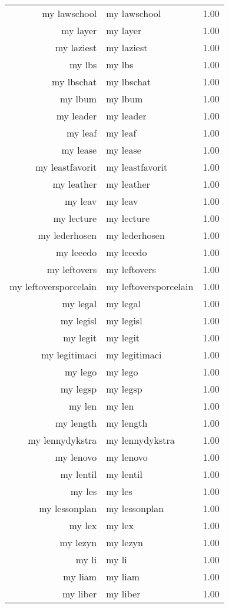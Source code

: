 \begin{table}[ht]
\begin{tabular}{rlr}
  my lawschool & my lawschool & 1.00 \\ 
  my layer & my layer & 1.00 \\ 
  my laziest & my laziest & 1.00 \\ 
  my lbs & my lbs & 1.00 \\ 
  my lbschat & my lbschat & 1.00 \\ 
  my lbum & my lbum & 1.00 \\ 
  my leader & my leader & 1.00 \\ 
  my leaf & my leaf & 1.00 \\ 
  my lease & my lease & 1.00 \\ 
  my leastfavorit & my leastfavorit & 1.00 \\ 
  my leather & my leather & 1.00 \\ 
  my leav & my leav & 1.00 \\ 
  my lecture & my lecture & 1.00 \\ 
  my lederhosen & my lederhosen & 1.00 \\ 
  my leeedo & my leeedo & 1.00 \\ 
  my leftovers & my leftovers & 1.00 \\ 
  my leftoversporcelain & my leftoversporcelain & 1.00 \\ 
  my legal & my legal & 1.00 \\ 
  my legisl & my legisl & 1.00 \\ 
  my legit & my legit & 1.00 \\ 
  my legitimaci & my legitimaci & 1.00 \\ 
  my lego & my lego & 1.00 \\ 
  my legsp & my legsp & 1.00 \\ 
  my len & my len & 1.00 \\ 
  my length & my length & 1.00 \\ 
  my lennydykstra & my lennydykstra & 1.00 \\ 
  my lenovo & my lenovo & 1.00 \\ 
  my lentil & my lentil & 1.00 \\ 
  my les & my les & 1.00 \\ 
  my lessonplan & my lessonplan & 1.00 \\ 
  my lex & my lex & 1.00 \\ 
  my lezyn & my lezyn & 1.00 \\ 
  my li & my li & 1.00 \\ 
  my liam & my liam & 1.00 \\ 
  my liber & my liber & 1.00 \\ 

\end{tabular}
\end{table}
